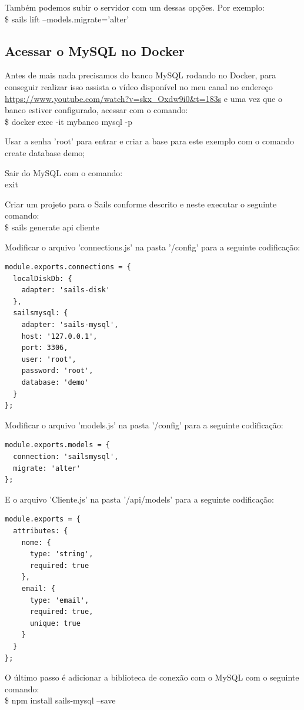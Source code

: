\documentclass[a4paper,11pt]{article}
\begin{document}
Também podemos subir o servidor com um dessas opções. Por exemplo: \\
{\ttfamily\$ sails lift --models.migrate='alter'}
 
\subsection{Acessar o MySQL no Docker}
Antes de mais nada precisamos do banco MySQL rodando no Docker, para conseguir realizar isso assista o vídeo disponível no meu canal no endereço \url{https://www.youtube.com/watch?v=skx_Oxdw9i0&t=183s} e uma vez que o banco estiver configurado, acessar com o comando: \\
{\ttfamily\$ docker exec -it mybanco mysql -p}

Usar a senha 'root' para entrar e criar a base para este exemplo com o comando \\
{\ttfamily create database demo;}

Sair do MySQL com o comando: \\
{\ttfamily exit}

Criar um projeto para o Sails conforme descrito e neste executar o seguinte comando: \\
{\ttfamily\$ sails generate api cliente}

Modificar o arquivo 'connections.js' na pasta '/config' para a seguinte codificação:
\begin{lstlisting}
module.exports.connections = {
  localDiskDb: {
    adapter: 'sails-disk'
  },
  sailsmysql: {
    adapter: 'sails-mysql',
    host: '127.0.0.1',
    port: 3306,
    user: 'root',
    password: 'root',
    database: 'demo'
  }
};
\end{lstlisting}

Modificar o arquivo 'models.js' na pasta '/config' para a seguinte codificação:
\begin{lstlisting}
module.exports.models = {
  connection: 'sailsmysql',
  migrate: 'alter'
};
\end{lstlisting}

E o arquivo 'Cliente.js' na pasta '/api/models' para a seguinte codificação:
\begin{lstlisting}
module.exports = {
  attributes: {
    nome: {
      type: 'string',
      required: true
    },
    email: {
      type: 'email',
      required: true,
      unique: true
    }
  }
};
\end{lstlisting}

O último passo é adicionar a biblioteca de conexão com o MySQL com o seguinte comando: \\
{\ttfamily\$ npm install sails-mysql --save}
\end{document}
